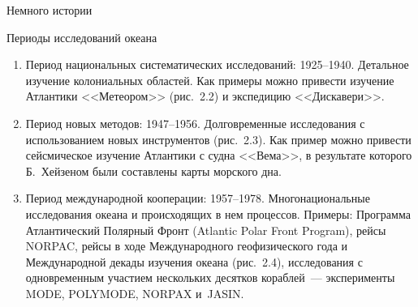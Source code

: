 \begin{chapter}{Немного истории}
\begin{section}{Периоды исследований океана}
\begin{enumerate}

\item
Период национальных систематических исследований: 1925--1940.
Детальное изучение колониальных областей. Как
примеры можно привести изучение Атлантики <<Метеором>> (рис.~2.2) и
экспедицию <<Дискавери>>.
%


\item
Период новых методов: 1947--1956. Долговременные
исследования с использованием новых инструментов (рис.~2.3). Как
пример можно привести сейсмическое изучение Атлантики с судна <<Вема>>, в
результате которого Б.~Хейзеном были составлены карты морского дна.
%


\item
Период международной кооперации: 1957--1978.
Многонациональные исследования океана и происходящих в нем процессов.
Примеры: Программа Атлантический Полярный Фронт
(Atlantic Polar Front Program), рейсы NORPAC, рейсы в ходе
Международного геофизического года и Международной декады изучения
океана (рис.~2.4), исследования с одновременным участием нескольких
десятков кораблей~--- эксперименты MODE, POLYMODE, NORPAX и~JASIN.
%


\end{enumerate}
\end{section}
\end{chapter}
